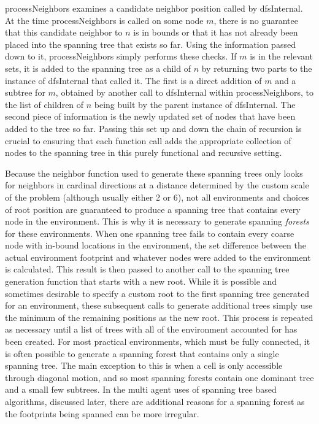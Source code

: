 processNeighbors examines a candidate neighbor position called by dfsInternal. At the time processNeighbors is called on some node $m$, there is no guarantee that this candidate neighbor to $n$ is in bounds or that it has not already been placed into the spanning tree that exists so far. Using the information passed down to it, processNeighbors simply performs these checks. If $m$ is in the relevant sets, it is added to the spanning tree as a child of $n$ by returning two parts to the instance of dfsInternal that called it. The first is a direct addition of $m$ and a subtree for $m$, obtained by another call to dfsInternal within processNeighbors, to the list of children of $n$ being built by the parent instance of dfsInternal. The second piece of information is the newly updated set of nodes that have been added to the tree so far. Passing this set up and down the chain of recursion is crucial to ensuring that each function call adds the appropriate collection of nodes to the spanning tree in this purely functional and recursive setting.

Because the neighbor function used to generate these spanning trees only looks for neighbors in cardinal directions at a distance determined by the custom scale of the problem (although usually either 2 or 6), not all environments and choices of root position are guaranteed to produce a spanning tree that contains every node in the environment. This is why it is necessary to generate spanning \textit{forests} for these environments. When one spanning tree fails to contain every coarse node with in-bound locations in the environment, the set difference between the actual environment footprint and whatever nodes were added to the environment is calculated. This result is then passed to another call to the spanning tree generation function that starts with a new root. While it is possible and sometimes desirable to specify a custom root to the first spanning tree generated for an environment, these subsequent calls to generate additional trees simply use the minimum of the remaining positions as the new root. This process is repeated as necessary until a list of trees with all of the environment accounted for has been created. For most practical environments, which must be fully connected, it is often possible to generate a spanning forest that contains only a single spanning tree. The main exception to this is when a cell is only accessible through diagonal motion, and so most spanning forests contain one dominant tree and a small few subtrees. In the multi agent uses of spanning tree based algorithms, discussed later, there are additional reasons for a spanning forest as the footprints being spanned can be more irregular.

